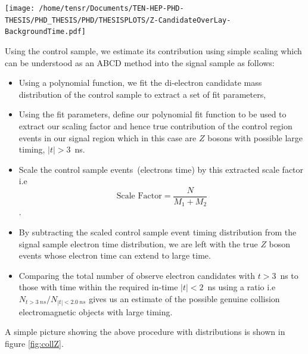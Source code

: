 \begin{center}
{\texttt{[image: /home/tensr/Documents/TEN-HEP-PHD-THESIS/PHD\_THESIS/PHD/THESISPLOTS/Z-CandidateOverLay-BackgroundTime.pdf]}}
\label{fig:Zmass}
\end{center}


Using the control sample, we estimate its contribution  using simple scaling which can be understood as an ABCD method into the signal sample as follows:
\begin{itemize}
\item Using a polynomial function, we fit the di-electron candidate mass distribution of the control sample to extract a set of fit parameters,
\item Using the fit parameters, define our polynomial fit function to be used to extract our scaling factor and hence true contribution of the control region events in our signal region which in this case are $Z$ bosons with possible large timing, $|t| > 3$~ns.
\item Scale the control sample events~(electrons time) by this extracted scale factor i.e $$\displaystyle{\mbox{Scale Factor} = \frac{N}{M_{1} + M_{2}}}$$.
\item By subtracting the scaled control sample event timing distribution from the signal sample electron time distribution, we are left with the true $Z$ boson events whose electron time can extend to large time.
\item Comparing the total number of observe electron candidates with $t > 3$~ns to those with time within the required in-time $|t| < 2$~ns using a ratio i.e $ N_{t > 3~ns}/ N_{|t| < 2.0~ns}$ gives us an estimate of the possible genuine collision electromagnetic objects with large timing. 
\end{itemize}  

A simple picture showing the above procedure with distributions is shown in figure \ref{fig:collZ}.

